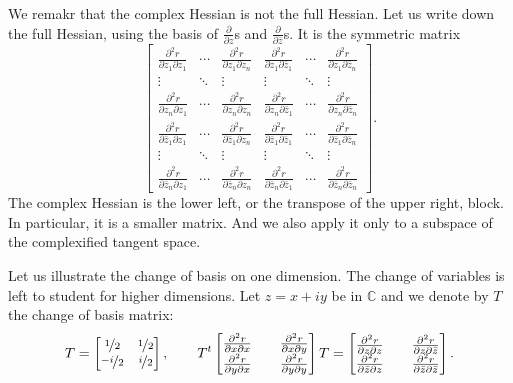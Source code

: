 \documentclass[12pt,openany]{book}
\newcommand{\C}{{\mathbb{C}}}
\theoremstyle{plain}
\theoremstyle{remark}
\theoremstyle{definition}
\theoremstyle{exercise}
\theoremstyle{example}
\begin{document}
We remakr that the complex Hessian is not the full Hessian.
Let us write down the full Hessian, using the
basis of $\frac{\partial}{\partial z}$s and
$\frac{\partial}{\partial \bar{z}}$s.  It is
the symmetric matrix
\begin{equation*}
\begin{bmatrix}
\frac{\partial^2 r}{\partial z_1 \partial z_1}
& \cdots &
\frac{\partial^2 r}{\partial z_1 \partial z_n}
&
\frac{\partial^2 r}{\partial z_1 \partial \bar{z}_1} 
& \cdots &
\frac{\partial^2 r}{\partial z_1 \partial \bar{z}_n} 
\\
\vdots & \ddots & \vdots & \vdots & \ddots & \vdots
\\
\frac{\partial^2 r}{\partial z_n \partial z_1}
& \cdots &
\frac{\partial^2 r}{\partial z_n \partial z_n}
&
\frac{\partial^2 r}{\partial z_n \partial \bar{z}_1} 
& \cdots &
\frac{\partial^2 r}{\partial z_n \partial \bar{z}_n} 
\\
\frac{\partial^2 r}{\partial \bar{z}_1 \partial z_1}
& \cdots &
\frac{\partial^2 r}{\partial \bar{z}_1 \partial z_n}
&
\frac{\partial^2 r}{\partial \bar{z}_1 \partial \bar{z}_1} 
& \cdots &
\frac{\partial^2 r}{\partial \bar{z}_1 \partial \bar{z}_n} 
\\
\vdots & \ddots & \vdots & \vdots & \ddots & \vdots
\\
\frac{\partial^2 r}{\partial \bar{z}_n \partial z_1}
& \cdots &
\frac{\partial^2 r}{\partial \bar{z}_n \partial z_n}
&
\frac{\partial^2 r}{\partial \bar{z}_n \partial \bar{z}_1} 
& \cdots &
\frac{\partial^2 r}{\partial \bar{z}_n \partial \bar{z}_n} 
\end{bmatrix}
.
\end{equation*}
The complex Hessian is the lower left,
or the transpose of the upper right, block.  In
particular, it is a smaller matrix. And we also apply it only to a subspace 
of the complexified tangent space.

Let us illustrate the change of basis on one dimension.  The change of
variables is left to student for higher dimensions.  Let $z =
x+iy$ be in $\C$ and we denote by $T$ the change of basis matrix:
\begin{equation*}
T = 
\begin{bmatrix}
\nicefrac{1}{2} & \nicefrac{1}{2} \\
\nicefrac{-i}{2} & \nicefrac{i}{2}
\end{bmatrix}
,
\qquad
T^t
\begin{bmatrix}
\frac{\partial^2 r}{\partial x \partial x} &&
\frac{\partial^2 r}{\partial x \partial y}
\\
\frac{\partial^2 r}{\partial y \partial x} &&
\frac{\partial^2 r}{\partial y \partial y}
\end{bmatrix}
T
=
\begin{bmatrix}
\frac{\partial^2 r}{\partial z \partial z} &&
\frac{\partial^2 r}{\partial z \partial \bar{z}}
\\
\frac{\partial^2 r}{\partial \bar{z} \partial z} &&
\frac{\partial^2 r}{\partial \bar{z} \partial \bar{z}}
\end{bmatrix}
.
\end{equation*}
\end{document}
